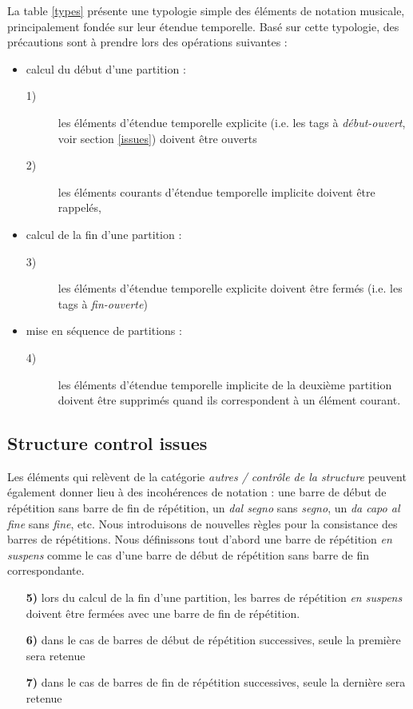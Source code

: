\documentclass{article}
\newcommand{\oend}			{\emph{fin-ouverte}}
\newcommand{\obeg}			{\emph{début-ouvert}}
\newcommand{\rulenum}[1]	{\textbf{#1}}
\begin{document}
La table  \ref{types} présente une typologie simple des éléments de notation musicale, principalement fondée sur leur étendue temporelle. Basé sur cette typologie, des précautions sont à prendre lors des opérations suivantes :

\begin{itemize}
\item calcul du début d'une partition :  
\begin{description}
	\item[1)] les éléments d'étendue temporelle explicite (i.e. les tags à \obeg , voir section \ref{issues}) doivent être ouverts
	\item[2)] les éléments courants d'étendue temporelle implicite  doivent être rappelés,
\end{description}
\item calcul de la fin d'une partition : 
\begin{description}
	\item[3)] les éléments d'étendue temporelle explicite doivent être fermés (i.e. les tags à \oend )
\end{description}
\item mise en séquence de partitions : 
\begin{description}
	\item[4)] les éléments d'étendue temporelle implicite de la deuxième partition doivent être supprimés quand ils correspondent à un élément courant.
\end{description}
\end{itemize}


\subsection{Structure control issues} \label{sc}
Les éléments qui relèvent de la catégorie \emph{autres / contrôle de la structure} peuvent également donner lieu à des incohérences de notation : une barre de début de répétition sans barre de fin de répétition, un \emph{dal segno} sans \emph{segno}, un \emph{da capo al fine} sans \emph{fine}, etc.
Nous introduisons de nouvelles règles pour la consistance des barres de répétitions. Nous définissons tout d'abord une barre de répétition \emph{en suspens} comme le cas d'une barre de début de répétition sans barre de fin correspondante. 
\begin{itemize}
\item[\rulenum{5)}] lors du calcul de la fin d'une partition, les barres de répétition \emph{en suspens} doivent être fermées avec une barre de fin de répétition.
\item[\rulenum{6)}] dans le cas de barres de début de répétition successives, seule la première sera retenue
\item[\rulenum{7)}] dans le cas de barres de fin de répétition successives, seule la dernière sera retenue
\end{itemize}
\end{document}

